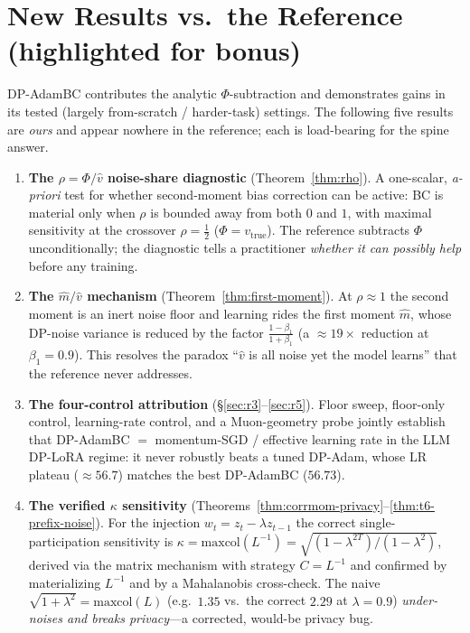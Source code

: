 \documentclass[11pt]{article}
\theoremstyle{plain}
\theoremstyle{definition}
\theoremstyle{remark}
\begin{document}
\section{New Results vs.\ the Reference (highlighted for bonus)}
\label{sec:new}

DP-AdamBC \citep{tang2024dpadambc} contributes the analytic $\Phi$-subtraction and demonstrates gains
in its tested (largely from-scratch / harder-task) settings. The following five results are
\emph{ours} and appear nowhere in the reference; each is load-bearing for the spine answer.

\begin{enumerate}[leftmargin=1.8em,itemsep=4pt,topsep=2pt]
\item \textbf{The $\rho=\Phi/\hat v$ noise-share diagnostic} (Theorem~\ref{thm:rho}). A one-scalar,
\emph{a-priori} test for whether second-moment bias correction can be active: BC is material only when
$\rho$ is bounded away from both $0$ and $1$, with maximal sensitivity at the crossover $\rho=\tfrac12$
($\Phi=v_{\mathrm{true}}$). The reference subtracts $\Phi$ unconditionally; the diagnostic tells a
practitioner \emph{whether it can possibly help} before any training.

\item \textbf{The $\hat m/\hat v$ mechanism} (Theorem~\ref{thm:first-moment}). At $\rho\approx1$ the
second moment is an inert noise floor and learning rides the first moment $\hat m$, whose DP-noise
variance is reduced by the factor $\tfrac{1-\beta_1}{1+\beta_1}$ (a $\approx19\times$ reduction at
$\beta_1{=}0.9$). This resolves the paradox ``$\hat v$ is all noise yet the model learns'' that the
reference never addresses.

\item \textbf{The four-control attribution} (\S\ref{sec:r3}--\ref{sec:r5}). Floor sweep, floor-only
control, learning-rate control, and a Muon-geometry probe jointly establish that DP-AdamBC $=$
momentum-SGD / effective learning rate in the LLM DP-LoRA regime: it never robustly beats a tuned
DP-Adam, whose LR plateau ($\approx56.7$) matches the best DP-AdamBC ($56.73$).

\item \textbf{The verified $\kappa$ sensitivity}
(Theorems~\ref{thm:corrmom-privacy}--\ref{thm:t6-prefix-noise}). For the injection
$w_t=z_t-\lambda z_{t-1}$ the correct single-participation sensitivity is
$\kappa=\mathrm{maxcol}(L^{-1})=\sqrt{(1-\lambda^{2T})/(1-\lambda^2)}$, derived via the matrix
mechanism with strategy $C=L^{-1}$ and confirmed by materializing $L^{-1}$ and by a Mahalanobis
cross-check. The naive $\sqrt{1+\lambda^2}=\mathrm{maxcol}(L)$ (e.g.\ $1.35$ vs.\ the correct $2.29$
at $\lambda{=}0.9$) \emph{under-noises and breaks privacy}---a corrected, would-be privacy bug.


\end{enumerate}
\end{document}
